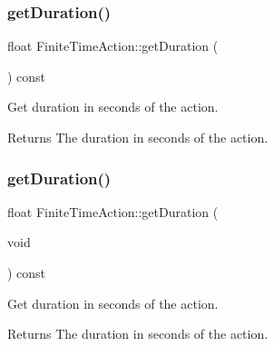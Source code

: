 \mbox{\label{classFiniteTimeAction_aaa74e388b42ead7cfb7ed9013f6f9aea}} 
\subsubsection{\texorpdfstring{get\+Duration()}{getDuration()}\hspace{0.1cm}{\footnotesize\ttfamily [1/2]}}
{\footnotesize\ttfamily float Finite\+Time\+Action\+::get\+Duration (\begin{DoxyParamCaption}{ }\end{DoxyParamCaption}) const\hspace{0.3cm}{\ttfamily [inline]}}

Get duration in seconds of the action.

\begin{DoxyReturn}{Returns}
The duration in seconds of the action. 
\end{DoxyReturn}
\mbox{\label{classFiniteTimeAction_aaa74e388b42ead7cfb7ed9013f6f9aea}} 
\subsubsection{\texorpdfstring{get\+Duration()}{getDuration()}\hspace{0.1cm}{\footnotesize\ttfamily [2/2]}}
{\footnotesize\ttfamily float Finite\+Time\+Action\+::get\+Duration (\begin{DoxyParamCaption}\item[{void}]{ }\end{DoxyParamCaption}) const\hspace{0.3cm}{\ttfamily [inline]}}

Get duration in seconds of the action.

\begin{DoxyReturn}{Returns}
The duration in seconds of the action. 
\end{DoxyReturn}
\mbox{\label{classFiniteTimeAction_a886bbdd2dc82167fe6ffae664c22dacc}} 
